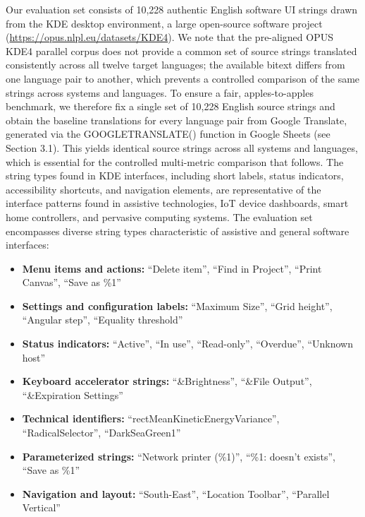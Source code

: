 \documentclass[Afour,sagev,times,doublespace]{sagej}
\begin{document}
Our evaluation set consists of 10,228 authentic English software UI strings drawn from the KDE desktop environment,\cite{28} a large open-source software project (\url{https://opus.nlpl.eu/datasets/KDE4}). We note that the pre-aligned OPUS KDE4 parallel corpus does not provide a common set of source strings translated consistently across all twelve target languages; the available bitext differs from one language pair to another, which prevents a controlled comparison of the same strings across systems and languages. To ensure a fair, apples-to-apples benchmark, we therefore fix a single set of 10,228 English source strings and obtain the baseline translations for every language pair from Google Translate, generated via the GOOGLETRANSLATE() function in Google Sheets (see Section 3.1). This yields identical source strings across all systems and languages, which is essential for the controlled multi-metric comparison that follows. The string types found in KDE interfaces, including short labels, status indicators, accessibility shortcuts, and navigation elements, are representative of the interface patterns found in assistive technologies, IoT device dashboards, smart home controllers, and pervasive computing systems. The evaluation set encompasses diverse string types characteristic of assistive and general software interfaces:

\begin{itemize}
\item \textbf{Menu items and actions:} ``Delete item'', ``Find in Project'', ``Print Canvas'', ``Save as \%1''
\item \textbf{Settings and configuration labels:} ``Maximum Size'', ``Grid height'', ``Angular step'', ``Equality threshold''
\item \textbf{Status indicators:} ``Active'', ``In use'', ``Read-only'', ``Overdue'', ``Unknown host''
\item \textbf{Keyboard accelerator strings:} ``\&Brightness'', ``\&File Output'', ``\&Expiration Settings''
\item \textbf{Technical identifiers:} ``rectMeanKineticEnergyVariance'', ``RadicalSelector'', ``DarkSeaGreen1''
\item \textbf{Parameterized strings:} ``Network printer (\%1)'', ``\%1: doesn't exists'', ``Save as \%1''
\item \textbf{Navigation and layout:} ``South-East'', ``Location Toolbar'', ``Parallel Vertical''
\end{itemize}
\end{document}
